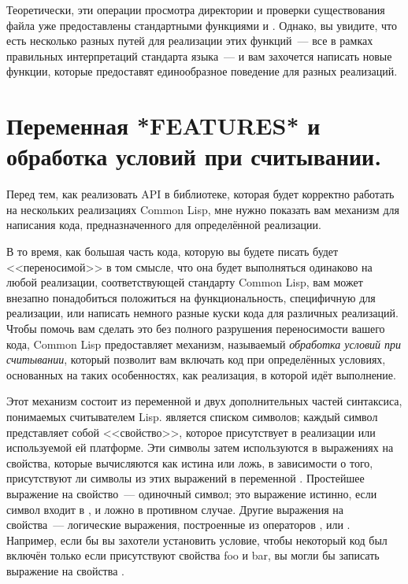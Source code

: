 Теоретически, эти операции просмотра директории и проверки существования файла уже
предоставлены стандартными функциями  и . Однако, вы
увидите, что есть несколько разных путей для реализации этих функций~--- все в рамках
правильных интерпретаций стандарта языка~--- и вам захочется написать новые функции,
которые предоставят единообразное поведение для разных реализаций.

\section{Переменная *FEATURES* и обработка условий при считывании.}

Перед тем, как реализовать API в библиотеке, которая будет корректно работать на
нескольких реализациях Common Lisp, мне нужно показать вам механизм для написания кода,
предназначенного для определённой реализации.

В то время, как большая часть кода, которую вы будете писать будет <<переносимой>> в том
смысле, что она будет выполняться одинаково на любой реализации, соответствующей стандарту
Common Lisp, вам может внезапно понадобиться положиться на функциональность, специфичную
для реализации, или написать немного разные куски кода для различных реализаций. Чтобы
помочь вам сделать это без полного разрушения переносимости вашего кода, Common Lisp
предоставляет механизм, называемый \textit{обработка условий при считывании}, который
позволит вам включать код при определённых условиях, основанных на таких особенностях, как
реализация, в которой идёт выполнение.

Этот механизм состоит из переменной  и двух дополнительных частей
синтаксиса, понимаемых считывателем Lisp.  является списком символов;
каждый символ представляет собой <<свойство>>, которое присутствует в реализации или
используемой ей платформе. Эти символы затем используются в выражениях на свойства,
которые вычисляются как истина или ложь, в зависимости о того, присутствуют ли символы из
этих выражений в переменной . Простейшее выражение на свойство~---
одиночный символ; это выражение истинно, если символ входит в , и ложно в
противном случае. Другие выражения на свойства~--- логические выражения, построенные из
операторов ,  или . Например, если бы вы захотели установить
условие, чтобы некоторый код был включён только если присутствуют свойства foo и bar, вы
могли бы записать выражение на свойства .


